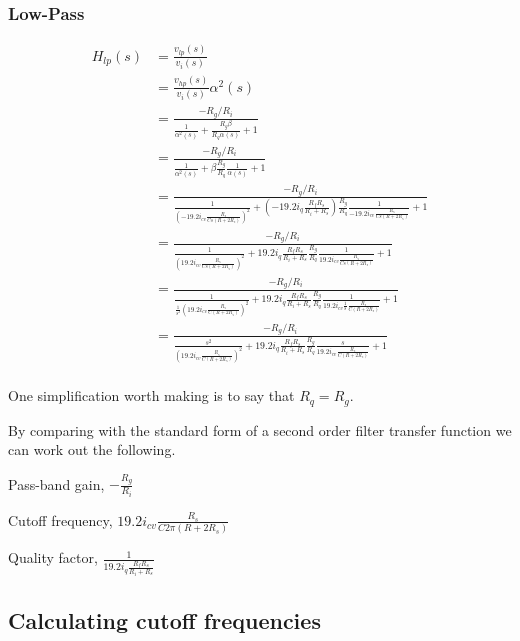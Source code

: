 \documentclass{article}
\begin{document}
\subsubsection{Low-Pass}

\begin{equation*}
\begin{split}
  H_{lp}(s) & = \frac{v_{lp}(s)}{v_i(s)} \\
            & = \frac{v_{hp}(s)}{v_i(s)}\alpha^2(s) \\
            & = \frac{-R_g/R_i}{\frac{1}{\alpha^2(s)} + \frac{R_g\beta}{R_q\alpha(s)} + 1 } \\
            & = \frac{-R_g/R_i}{\frac{1}{\alpha^2(s)} + \beta\frac{R_g}{R_q}\frac{1}{\alpha(s)} + 1 } \\
            & = \frac{-R_g/R_i}{\frac{1}{(-19.2i_{cv}\frac{R_s}{Cs(R + 2R_s)})^2} + (-19.2i_{q}\frac{R_fR_s}{R_i + R_s})\frac{R_g}{R_q}\frac{1}{-19.2i_{cv}\frac{R_s}{Cs(R + 2R_s)}} + 1 } \\
            & = \frac{-R_g/R_i}{\frac{1}{(19.2i_{cv}\frac{R_s}{Cs(R + 2R_s)})^2} + 19.2i_{q}\frac{R_fR_s}{R_i + R_s}\frac{R_g}{R_q}\frac{1}{19.2i_{cv}\frac{R_s}{Cs(R + 2R_s)}} + 1 } \\
            & = \frac{-R_g/R_i}{\frac{1}{\frac{1}{s^2}(19.2i_{cv}\frac{R_s}{C(R + 2R_s)})^2} + 19.2i_{q}\frac{R_fR_s}{R_i + R_s}\frac{R_g}{R_q}\frac{1}{19.2i_{cv}\frac{1}{s}\frac{R_s}{C(R + 2R_s)}} + 1 } \\
            & = \frac{-R_g/R_i}{\frac{s^2}{(19.2i_{cv}\frac{R_s}{C(R + 2R_s)})^2} + 19.2i_{q}\frac{R_fR_s}{R_i + R_s}\frac{R_g}{R_q}\frac{s}{19.2i_{cv}\frac{R_s}{C(R + 2R_s)}} + 1 } \\
\end{split}
\end{equation*}

One simplification worth making is to say that $R_q = R_g$.

By comparing with the standard form of a second order filter transfer function we can work out the following.

\begin{description}
  \item Pass-band gain, $-\frac{R_g}{R_i}$
  \item Cutoff frequency, $19.2i_{cv}\frac{R_s}{C2\pi(R + 2R_s)}$
  \item Quality factor, $\frac{1}{19.2i_{q}\frac{R_fR_s}{R_i + R_s}}$
\end{description}

\subsection{Calculating cutoff frequencies}
\end{document}
